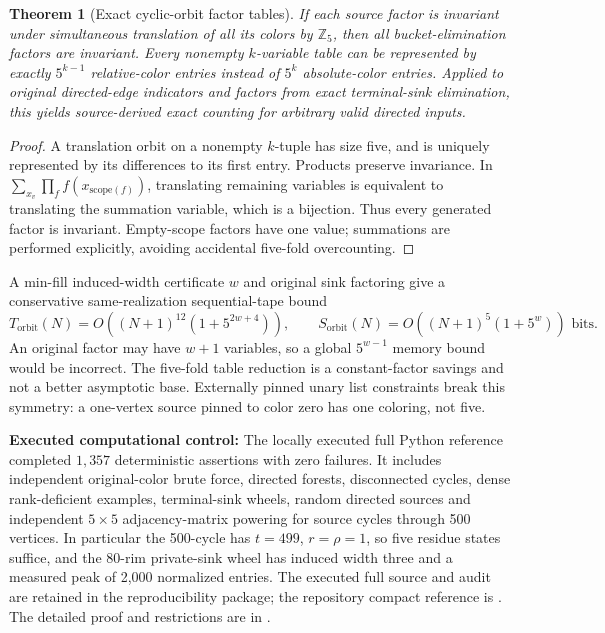 \documentclass[11pt]{article}
\newtheorem{theorem}{Theorem}
\begin{document}
\begin{theorem}[Exact cyclic-orbit factor tables]
If each source factor is invariant under simultaneous translation of
all its colors by $\mathbb Z_5$, then all bucket-elimination factors
are invariant. Every nonempty $k$-variable table can be represented
by exactly $5^{k-1}$ relative-color entries instead of $5^k$
absolute-color entries. Applied to original directed-edge indicators
and factors from exact terminal-sink elimination, this yields
source-derived exact counting for arbitrary valid directed inputs.
\end{theorem}
\begin{proof}
A translation orbit on a nonempty $k$-tuple has size five,
and is uniquely represented by its differences to its first entry.
Products preserve invariance. In
$\sum_{x_v}\prod_f f(x_{\mathrm{scope}(f)})$, translating remaining
variables is equivalent to translating the summation variable,
which is a bijection. Thus every generated factor is invariant.
Empty-scope factors have one value; summations are performed
explicitly, avoiding accidental five-fold overcounting.
\end{proof}

\noindent A min-fill induced-width certificate $w$ and original
sink factoring give a conservative same-realization sequential-tape
bound
\[
T_{\mathrm{orbit}}(N)=
O((N+1)^{12}(1+5^{2w+4})),\qquad
S_{\mathrm{orbit}}(N)=O((N+1)^5(1+5^w))\text{ bits}.
\]
An original factor may have $w+1$ variables, so a global
$5^{w-1}$ memory bound would be incorrect. The five-fold table
reduction is a constant-factor savings and not a better asymptotic
base. Externally pinned unary list constraints break this symmetry:
a one-vertex source pinned to color zero has one coloring, not five.

\noindent\textbf{Executed computational control:}
The locally executed full Python reference completed
$1{,}357$ deterministic assertions with zero failures. It includes
independent original-color brute force, directed forests, disconnected
cycles, dense rank-deficient examples, terminal-sink wheels, random
directed sources and independent $5\times5$ adjacency-matrix
powering for source cycles through 500 vertices. In particular
the 500-cycle has $t=499$, $r=\rho=1$, so five residue states
suffice, and the 80-rim private-sink wheel has induced width
three and a measured peak of 2,000 normalized entries.
The executed full source and audit are retained in the
reproducibility package; the repository compact reference is
.
The detailed proof and restrictions are in
.
\end{document}
